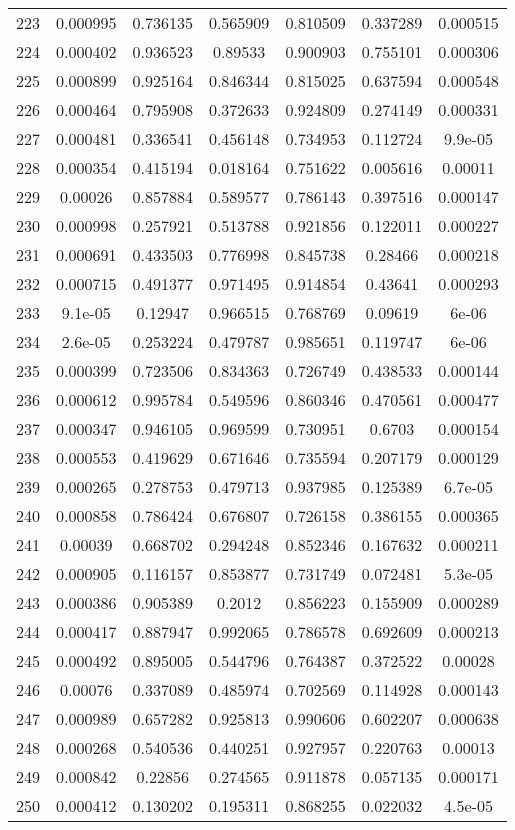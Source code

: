 \begin{table}
\begin{tabular}{c|c|c|c|c|c|c}
223 & 0.000995 & 0.736135 & 0.565909 & 0.810509 & 0.337289 & 0.000515\\
224 & 0.000402 & 0.936523 & 0.89533 & 0.900903 & 0.755101 & 0.000306\\
225 & 0.000899 & 0.925164 & 0.846344 & 0.815025 & 0.637594 & 0.000548\\
226 & 0.000464 & 0.795908 & 0.372633 & 0.924809 & 0.274149 & 0.000331\\
227 & 0.000481 & 0.336541 & 0.456148 & 0.734953 & 0.112724 & 9.9e-05\\
228 & 0.000354 & 0.415194 & 0.018164 & 0.751622 & 0.005616 & 0.00011\\
229 & 0.00026 & 0.857884 & 0.589577 & 0.786143 & 0.397516 & 0.000147\\
230 & 0.000998 & 0.257921 & 0.513788 & 0.921856 & 0.122011 & 0.000227\\
231 & 0.000691 & 0.433503 & 0.776998 & 0.845738 & 0.28466 & 0.000218\\
232 & 0.000715 & 0.491377 & 0.971495 & 0.914854 & 0.43641 & 0.000293\\
233 & 9.1e-05 & 0.12947 & 0.966515 & 0.768769 & 0.09619 & 6e-06\\
234 & 2.6e-05 & 0.253224 & 0.479787 & 0.985651 & 0.119747 & 6e-06\\
235 & 0.000399 & 0.723506 & 0.834363 & 0.726749 & 0.438533 & 0.000144\\
236 & 0.000612 & 0.995784 & 0.549596 & 0.860346 & 0.470561 & 0.000477\\
237 & 0.000347 & 0.946105 & 0.969599 & 0.730951 & 0.6703 & 0.000154\\
238 & 0.000553 & 0.419629 & 0.671646 & 0.735594 & 0.207179 & 0.000129\\
239 & 0.000265 & 0.278753 & 0.479713 & 0.937985 & 0.125389 & 6.7e-05\\
240 & 0.000858 & 0.786424 & 0.676807 & 0.726158 & 0.386155 & 0.000365\\
241 & 0.00039 & 0.668702 & 0.294248 & 0.852346 & 0.167632 & 0.000211\\
242 & 0.000905 & 0.116157 & 0.853877 & 0.731749 & 0.072481 & 5.3e-05\\
243 & 0.000386 & 0.905389 & 0.2012 & 0.856223 & 0.155909 & 0.000289\\
244 & 0.000417 & 0.887947 & 0.992065 & 0.786578 & 0.692609 & 0.000213\\
245 & 0.000492 & 0.895005 & 0.544796 & 0.764387 & 0.372522 & 0.00028\\
246 & 0.00076 & 0.337089 & 0.485974 & 0.702569 & 0.114928 & 0.000143\\
247 & 0.000989 & 0.657282 & 0.925813 & 0.990606 & 0.602207 & 0.000638\\
248 & 0.000268 & 0.540536 & 0.440251 & 0.927957 & 0.220763 & 0.00013\\
249 & 0.000842 & 0.22856 & 0.274565 & 0.911878 & 0.057135 & 0.000171\\
250 & 0.000412 & 0.130202 & 0.195311 & 0.868255 & 0.022032 & 4.5e-05\\
\end{tabular}
\end{table}
